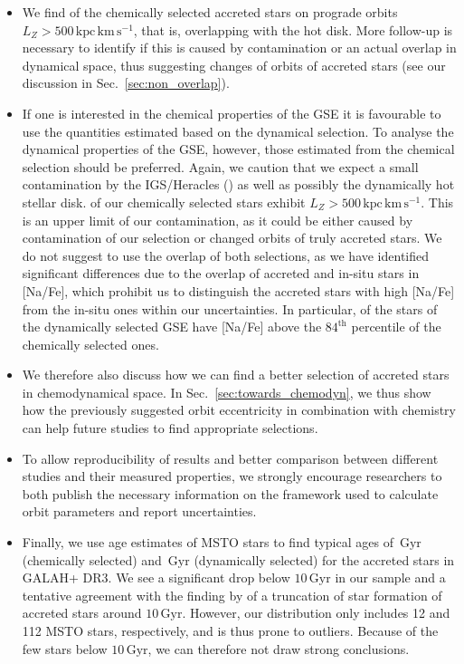 \documentclass[fleqn,usenatbib]{mnras}
\newcommand{\added}[1]{#1}
\newcommand{\Gyr}{\,\mathrm{Gyr}}	%
\newcommand{\kpckms}{\,\mathrm{kpc\,km\,s^{-1}}}	%
\begin{document}
\begin{itemize}
\item We find  of the chemically selected accreted stars on prograde orbits $L_Z > 500 \kpckms$, that is, overlapping with the hot disk. More follow-up is necessary to identify if this is caused by contamination or an actual overlap in dynamical space, thus suggesting changes of orbits of accreted stars (see our discussion in Sec.~\ref{sec:non_overlap}).
\item If one is interested in the chemical properties of the GSE it is favourable to use the quantities estimated based on the dynamical selection. To analyse the dynamical properties of the GSE, however, those estimated from the chemical selection should be preferred. Again, we caution that we expect a small contamination by the IGS/Heracles () as well as possibly the dynamically hot stellar disk.  of our chemically selected stars exhibit $L_Z > 500\kpckms$. This is an upper limit of our contamination, as it could be either caused by contamination of our selection or changed orbits of truly accreted stars. We do not suggest to use the overlap of both selections, as we have identified significant differences due to the overlap of accreted and in-situ stars in [Na/Fe], which prohibit us to distinguish the accreted stars with high [Na/Fe] from the in-situ ones within our uncertainties. In particular,  of the stars of the dynamically selected GSE have [Na/Fe] above the $84^\text{th}$ percentile of the chemically selected ones.
\item We therefore also discuss how we can find a better selection of accreted stars in chemodynamical space. In Sec.~\ref{sec:towards_chemodyn}, we thus show how the previously suggested orbit eccentricity \citep[see e.g.][]{Mackereth2019, Naidu2020} in combination with chemistry can help future studies to find appropriate selections.
\item \added{To allow reproducibility of results and better comparison between different studies and their measured properties, we strongly encourage researchers to both publish the necessary information on the framework used to calculate orbit parameters and report uncertainties.}
\item Finally, we use age estimates of MSTO stars to find typical ages of $\Gyr$ (chemically selected) and $\Gyr$ (dynamically selected) for the accreted stars in GALAH+ DR3. \added{We see a significant drop below $10\Gyr$ in our sample and a tentative agreement with the finding by \citet{Bonaca2020} of a truncation of star formation of accreted stars around $10\Gyr$. However, our distribution only includes 12 and 112 MSTO stars, respectively, and is thus prone to outliers. Because of the few stars below $10\Gyr$, we can therefore not draw strong conclusions.}
\end{itemize}
\end{document}
